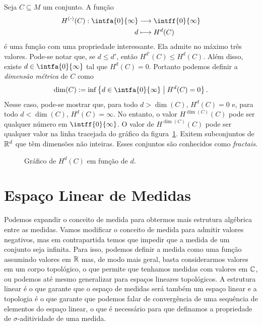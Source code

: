 Seja $C \subseteq M$ um conjunto. A função
	\begin{align*}
	\func{H^{(\var)}(C)}{\intfa{0}{\infty}}{\intff{0}{\infty}}{d}{H^d(C)}
	\end{align*}
é uma função com uma propriedade interessante. Ela admite no máximo três valores. Pode-se notar que, se $d \leq d'$, então $H^{d'}(C) \leq H^d(C)$. Além disso, existe $d \in \intfa{0}{\infty}$ tal que $H^d(C) = 0$. Portanto podemos definir a \emph{dimensão métrica} de $C$ como
	\begin{equation*}
	\dim(C) := \inf\set{d \in \intfa{0}{\infty}}{H^d(C)=0}.
	\end{equation*}
Nesse caso, pode-se mostrar que, para todo $d>\dim(C)$, $H^d(C) = 0$ e, para todo $d < \dim(C)$, $H^d(C) = \infty$. No entanto, o valor $H^{\dim(C)}(C)$ pode ser qualquer número em $\intff{0}{\infty}$. O valor de $H^{\dim(C)}(C)$ pode ser qualquer valor na linha tracejada do gráfico da figura~\ref{fig:dimensaometrica}. Exitem subconjuntos de $\mathbb{R}^d$ que têm dimensões não inteiras. Esses conjuntos são conhecidos como \emph{fractais}.

\begin{figure}
\centering
{}
\caption{Gráfico de $H^d(C)$ em função de $d$.}
\label{fig:dimensaometrica}
\end{figure}









\section{Espaço Linear de Medidas}

Podemos expandir o conceito de medida para obtermos mais estrutura algébrica entre as medidas. Vamos modificar o conceito de medida para admitir valores negativos, mas em contrapartida temos que impedir que a medida de um conjunto seja infinita. Para isso, podemos definir a medida como uma função assumindo valores em $\mathbb{R}$ mas, de modo mais geral, basta considerarmos valores em um corpo topológico, o que permite que tenhamos medidas com valores em $\mathbb{C}$, ou podemos até mesmo generalizar para espaços lineares topológicos. A estrutura linear é o que garante que o espaço de medidas será também um espaço linear e a topologia é o que garante que podemos falar de convergência de uma sequência de elementos do espaço linear, o que é necessário para que definamos a propriedade de $\sigma$-aditividade de uma medida.

